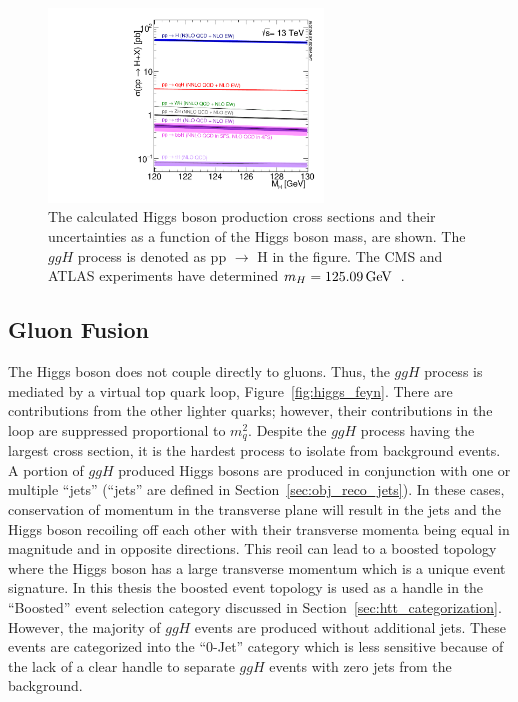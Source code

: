 \begin{figure}[htbp]
\centering
     \includegraphics[width=0.65\textwidth]{phenomenology_of_processes/plots/plot_13tev_H_sqrt.pdf}
     \caption{
The calculated Higgs boson production cross sections and their uncertainties
as a function of the Higgs boson mass, are shown. The $ggH$ process
is denoted as pp $\to$ H in the figure.
The CMS and ATLAS experiments have determined $m_{H} = 125.09\,\mathrm{GeV}$~\cite{Aad:2015zhl}.
     }
     \label{fig:higgs_production}
\end{figure}


\subsection{Gluon Fusion}
The Higgs boson does not couple directly to gluons. Thus, the $ggH$ process is mediated by 
a virtual top quark loop, Figure~\ref{fig:higgs_feyn}. There are contributions from the other lighter quarks; however,
their contributions in the loop are suppressed proportional to $m^{2}_{q}$.
Despite the $ggH$ process having the largest cross section, it is the hardest process to 
isolate from background events. A portion of $ggH$ produced Higgs bosons are produced
in conjunction with one or multiple ``jets'' (``jets'' are defined in Section~\ref{sec:obj_reco_jets}).
In these cases, conservation of momentum in the transverse plane will result in the jets
and the Higgs boson recoiling off each other with their transverse momenta being
equal in magnitude and in opposite directions. This reoil can lead to a boosted topology
where the Higgs boson has a large transverse momentum
which is a unique event signature. In this thesis the boosted event topology
is used as a handle in the ``Boosted'' event selection category discussed in
Section~\ref{sec:htt_categorization}. However, the majority of $ggH$ events are produced without
additional jets. 
These events are categorized into the ``0-Jet'' category which is less sensitive because of the
lack of a clear handle to separate $ggH$ events with zero jets from the background. 


